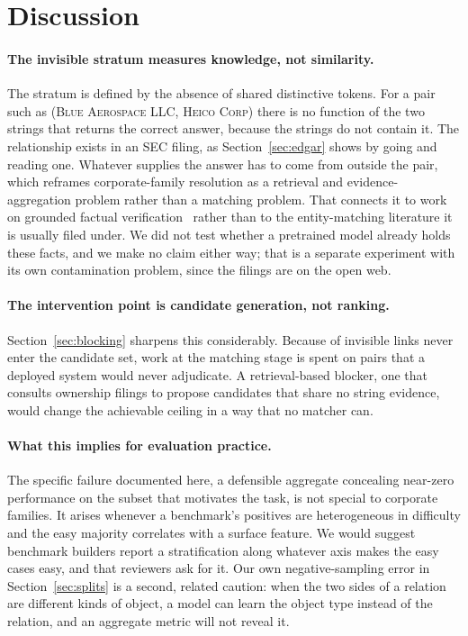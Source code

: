 \section{Discussion}
\label{sec:discussion}

\paragraph{The invisible stratum measures knowledge, not similarity.} The stratum is
defined by the absence of shared distinctive tokens. For a pair such as (\textsc{Blue
Aerospace LLC}, \textsc{Heico Corp}) there is no function of the two strings that returns
the correct answer, because the strings do not contain it. The relationship exists in an
SEC filing, as Section~\ref{sec:edgar} shows by going and reading one. Whatever supplies
the answer has to come from outside the pair, which reframes corporate-family resolution
as a retrieval and evidence-aggregation problem rather than a matching problem. That
connects it to work on grounded factual
verification~\citep{wei2024simpleqa,wei2025browsecomp,chen2025browsecompplus} rather than
to the entity-matching literature it is usually filed under. We did not test whether a
pretrained model already holds these facts, and we make no claim either way; that is a
separate experiment with its own contamination problem, since the filings are on the open
web.

\paragraph{The intervention point is candidate generation, not ranking.}
Section~\ref{sec:blocking} sharpens this considerably. Because \BlkInvisibleLost of
invisible links never enter the candidate set, work at the matching stage is spent on
pairs that a deployed system would never adjudicate. A retrieval-based blocker, one
that consults ownership filings to propose candidates that share no string evidence,
would change the achievable ceiling in a way that no matcher can.

\paragraph{What this implies for evaluation practice.} The specific failure documented
here, a defensible aggregate concealing near-zero performance on the subset that motivates
the task, is not special to corporate families. It arises whenever a benchmark's positives
are heterogeneous in difficulty and the easy majority correlates with a surface feature.
We would suggest benchmark builders report a stratification along whatever axis makes the
easy cases easy, and that reviewers ask for it. Our own negative-sampling error in
Section~\ref{sec:splits} is a second, related caution: when the two sides of a relation are
different kinds of object, a model can learn the object type instead of the relation, and
an aggregate metric will not reveal it.

